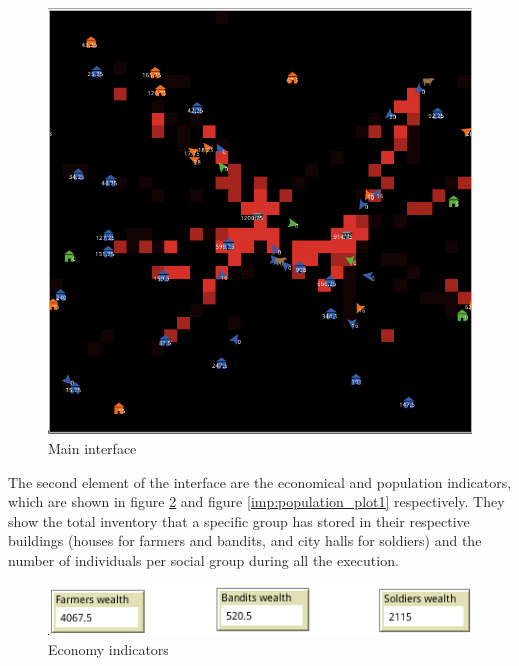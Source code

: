 \documentclass{wscpaperproc}
\begin{document}
\begin{figure}[h!]
    \centering
    \includegraphics[scale=0.65]{Images/Interface1}
    \caption{Main interface}
    \label{imp:main_interface1}
\end{figure}

The second element of the interface are the economical and population indicators,
which are shown in figure \ref{imp:economy1} and figure
\ref{imp:population_plot1} respectively. They show the total inventory that
a specific group has stored in their respective buildings (houses for
farmers and bandits, and city halls for soldiers) and the number of
individuals per social group during all the execution.\\

\begin{figure}[h!]
    \centering
    \includegraphics[scale=0.5]{Images/Economy1}
    \caption{Economy indicators}
    \label{imp:economy1}
\end{figure}
\end{document}
